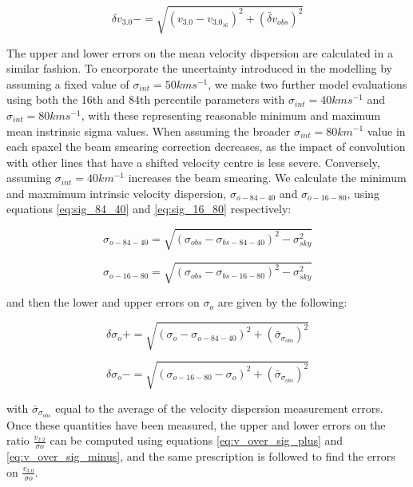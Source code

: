 \documentclass[fleqn,usenatbib]{mn2e}
\begin{document}
\begin{equation}\label{eq:v3.0_minus}
   \delta v_{3.0}- = \sqrt{(v_{3.0} - v_{3.0_{16}})^{2}  + (\bar{\delta}v_{obs})^{2}}
\end{equation}

The upper and lower errors on the mean velocity dispersion are calculated in a similar fashion.
To encorporate the uncertainty introduced in the modelling by assuming a fixed value of $\sigma_{int}=50kms^{-1}$, we make two further model evaluations using both the 16th and 84th percentile parameters with $\sigma_{int} = 40kms^{-1}$ and $\sigma_{int} = 80kms^{-1}$, with these representing reasonable minimum and maximum mean instrinsic sigma values.
When assuming the broader $\sigma_{int} = 80km^{-1}$ value in each spaxel the beam smearing correction decreases, as the impact of convolution with other lines that have a shifted velocity centre is less severe.
Conversely, assuming $\sigma_{int} = 40km^{-1}$ increases the beam smearing.
We calculate the minimum and maxmimum intrinsic velocity dispersion, $\sigma_{o-84-40}$ and $\sigma_{o-16-80}$, using equations \ref{eq:sig_84_40} and \ref{eq:sig_16_80} respectively:

\begin{equation}\label{eq:sig_84_40}
   \sigma_{o-84-40} = \sqrt{(\sigma_{obs} - \sigma_{bs-84-40})^{2} - \sigma_{sky}^{2}}
\end{equation}

\begin{equation}\label{eq:sig_16_80}
   \sigma_{o-16-80} = \sqrt{(\sigma_{obs} - \sigma_{bs-16-80})^{2} - \sigma_{sky}^{2}}
\end{equation}

and then the lower and upper errors on $\sigma_{o}$ are given by the following:

\begin{equation}\label{eq:sig_plus_error}
   \delta\sigma_{o}+ = \sqrt{(\sigma_{o} - \sigma_{o-84-40})^{2} + (\bar{\sigma}_{\sigma_{obs}})^{2}}
\end{equation}

\begin{equation}\label{eq:sig_minus_error}
   \delta\sigma_{o}- = \sqrt{(\sigma_{o-16-80} - \sigma_{o})^{2} + (\bar{\sigma}_{\sigma_{obs}})^{2}}
\end{equation}

with $\bar{\sigma}_{\sigma_{obs}}$ equal to the average of the velocity dispersion measurement errors.
Once these quantities have been measured, the upper and lower errors on the ratio $\frac{v_{2.2}}{\sigma{o}}$ can be computed using equations \ref{eq:v_over_sig_plus} and \ref{eq:v_over_sig_minus}, and the same prescription is followed to find the errors on $\frac{v_{3.0}}{\sigma{o}}$.
\end{document}
